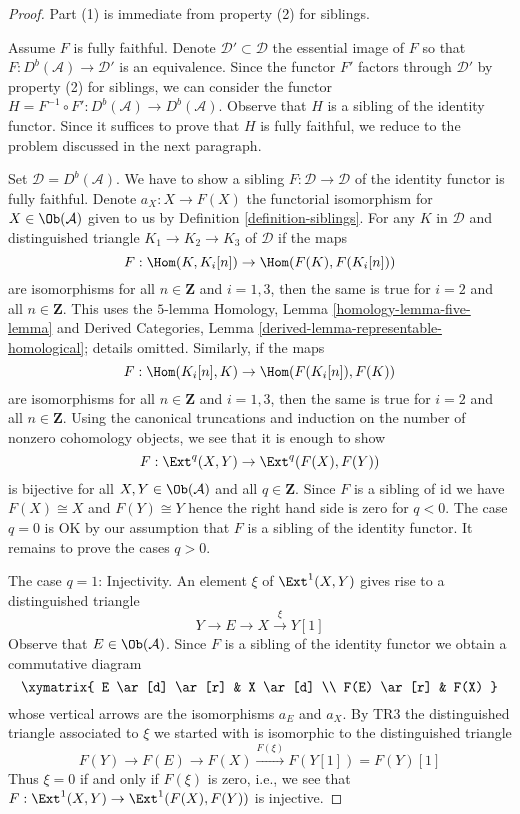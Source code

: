 \begin{proof}
Part (1) is immediate from property (2) for siblings.

\medskip\noindent
Assume $F$ is fully faithful. Denote $\mathcal{D}' \subset \mathcal{D}$
the essential image of $F$ so that $F : D^b(\mathcal{A}) \to \mathcal{D}'$
is an equivalence. Since the functor $F'$ factors through $\mathcal{D}'$
by property (2) for siblings, we can consider the functor
$H = F^{-1} \circ F' : D^b(\mathcal{A}) \to D^b(\mathcal{A})$.
Observe that $H$ is a sibling of the identity functor.
Since it suffices to prove that $H$ is fully faithful,
we reduce to the problem discussed in the next paragraph.

\medskip\noindent
Set $\mathcal{D} = D^b(\mathcal{A})$. We have to show a sibling
$F : \mathcal{D} \to \mathcal{D}$ of the identity functor is fully faithful.
Denote $a_X : X \to F(X)$ the functorial isomorphism for
$X \in \Ob(\mathcal{A})$ given to us by Definition \ref{definition-siblings}.
For any $K$ in $\mathcal{D}$ and distinguished triangle
$K_1 \to K_2 \to K_3$ of $\mathcal{D}$
if the maps
$$
F : \Hom(K, K_i[n]) \to \Hom(F(K), F(K_i[n]))
$$
are isomorphisms for all $n \in \mathbf{Z}$ and $i = 1, 3$, then the
same is true for $i = 2$ and all $n \in \mathbf{Z}$. This uses the
$5$-lemma Homology, Lemma \ref{homology-lemma-five-lemma} and
Derived Categories, Lemma \ref{derived-lemma-representable-homological};
details omitted. Similarly, if the maps
$$
F : \Hom(K_i[n], K) \to \Hom(F(K_i[n]), F(K))
$$
are isomorphisms for all $n \in \mathbf{Z}$ and $i = 1, 3$, then the
same is true for $i = 2$ and all $n \in \mathbf{Z}$. Using the canonical
truncations and induction on the number of nonzero cohomology objects,
we see that it is enough to show
$$
F : \Ext^q(X, Y) \to \Ext^q(F(X), F(Y))
$$
is bijective for all $X, Y \in \Ob(\mathcal{A})$ and all $q \in \mathbf{Z}$.
Since $F$ is a sibling of $\text{id}$ we have $F(X) \cong X$ and
$F(Y) \cong Y$ hence the right hand side is zero for $q < 0$.
The case $q = 0$ is OK by our assumption that $F$ is a sibling of
the identity functor. It remains to prove the cases $q > 0$.

\medskip\noindent
The case $q = 1$: Injectivity. An element $\xi$ of $\Ext^1(X, Y)$
gives rise to a distinguished triangle
$$
Y \to E \to X \xrightarrow{\xi} Y[1]
$$
Observe that $E \in \Ob(\mathcal{A})$. Since $F$ is a sibling of the
identity functor we obtain a commutative diagram
$$
\xymatrix{
E \ar[d] \ar[r] & X \ar[d] \\
F(E) \ar[r] & F(X)
}
$$
whose vertical arrows are the isomorphisms $a_E$ and $a_X$.
By TR3 the distinguished triangle associated to $\xi$ we started
with is isomorphic to the distinguished triangle
$$
F(Y) \to F(E) \to F(X) \xrightarrow{F(\xi)} F(Y[1]) = F(Y)[1]
$$
Thus $\xi = 0$ if and only if $F(\xi)$ is zero, i.e., we see that
$F : \Ext^1(X, Y) \to \Ext^1(F(X), F(Y))$ is injective.


\end{proof}
